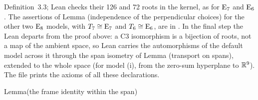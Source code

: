Definition~3.3; Lean checks their 126 and 72 roots in the kernel, as for $\mathrm{E}_7$
and $\mathrm{E}_6$. The assertions of Lemma (independence of the perpendicular choices) for the
other two $\mathrm{E}_8$ models, with $T_7\cong\mathrm{E}_7$ and $T_6\cong\mathrm{E}_6$, are in
. In the final step the Lean departs from the
proof above: a C3 isomorphism is a bijection of roots, not a map of the ambient space, so Lean
carries the automorphisms of the default model across it through the span isometry of
Lemma (transport on spans), extended to the whole space (for model (i), from the zero-sum
hyperplane to ${\mathbb R}^9$). The file  prints the axioms of
all these declarations.\par
\endgroup

\begin{namedresult}{Lemma}{(the frame identity within the span)}\label{lem:sec3-frame}
\end{namedresult}
